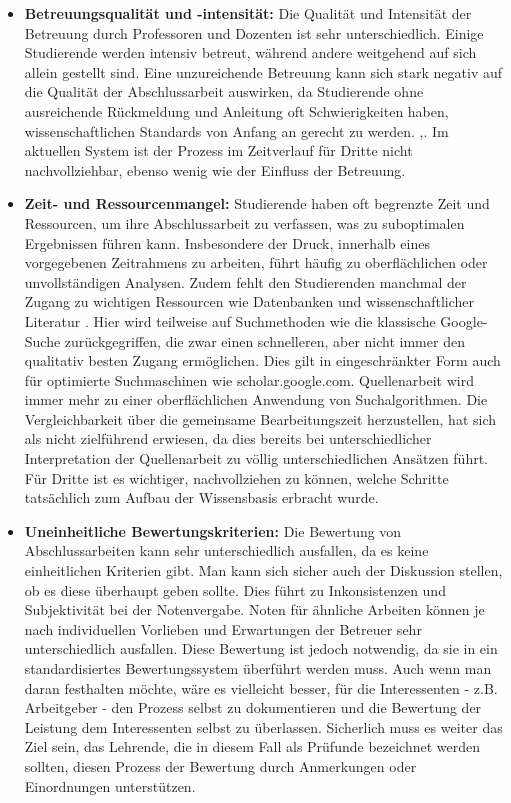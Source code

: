 \documentclass[conference]{IEEEtran}
\begin{document}
\begin{itemize}[leftmargin=*]
    \item \textbf{Betreuungsqualität und -intensität:}
    \newline Die Qualität und Intensität der Betreuung durch Professoren und Dozenten ist sehr unterschiedlich. Einige Studierende werden intensiv betreut, während andere weitgehend auf sich allein gestellt sind. Eine unzureichende Betreuung kann sich stark negativ auf die Qualität der Abschlussarbeit auswirken, da Studierende ohne ausreichende Rückmeldung und Anleitung oft Schwierigkeiten haben, wissenschaftlichen Standards von Anfang an gerecht zu werden. \cite{betreuungsleistung2023},\cite{ghadirian2014}.  Im aktuellen System ist der Prozess im Zeitverlauf für Dritte nicht nachvollziehbar, ebenso wenig wie der Einfluss der Betreuung. 

    \item \textbf{Zeit- und Ressourcenmangel:}
    \newline Studierende haben oft begrenzte Zeit und Ressourcen, um ihre Abschlussarbeit zu verfassen, was zu suboptimalen Ergebnissen führen kann. Insbesondere der Druck, innerhalb eines vorgegebenen Zeitrahmens zu arbeiten, führt häufig zu oberflächlichen oder unvollständigen Analysen. Zudem fehlt den Studierenden manchmal der Zugang zu wichtigen Ressourcen wie Datenbanken und wissenschaftlicher Literatur \cite{Rabab}. Hier wird teilweise auf Suchmethoden wie die klassische Google-Suche zurückgegriffen, die zwar einen schnelleren, aber nicht immer den qualitativ besten Zugang ermöglichen. Dies gilt in eingeschränkter Form auch für optimierte Suchmaschinen wie scholar.google.com. Quellenarbeit wird immer mehr zu einer oberflächlichen Anwendung von Suchalgorithmen. Die Vergleichbarkeit über die gemeinsame Bearbeitungszeit herzustellen, hat sich als nicht zielführend erwiesen, da dies bereits bei unterschiedlicher Interpretation der Quellenarbeit zu völlig unterschiedlichen Ansätzen führt. Für Dritte ist es wichtiger, nachvollziehen zu können, welche Schritte tatsächlich zum Aufbau der Wissensbasis erbracht wurde. 

    \item \textbf{Uneinheitliche Bewertungskriterien:}
    \newline Die Bewertung von Abschlussarbeiten kann sehr unterschiedlich ausfallen, da es keine einheitlichen Kriterien gibt. Man kann sich sicher auch der Diskussion stellen, ob es diese überhaupt geben sollte. Dies führt zu Inkonsistenzen und Subjektivität bei der Notenvergabe. Noten für ähnliche Arbeiten können je nach individuellen Vorlieben und Erwartungen der Betreuer sehr unterschiedlich ausfallen. Diese Bewertung ist jedoch notwendig, da sie in ein standardisiertes Bewertungssystem überführt werden muss. Auch wenn man daran festhalten möchte, wäre es vielleicht besser, für die Interessenten - z.B. Arbeitgeber - den Prozess selbst zu dokumentieren und die Bewertung der Leistung dem Interessenten selbst zu überlassen. Sicherlich muss es weiter das Ziel sein, das Lehrende, die in diesem Fall als Prüfunde bezeichnet werden sollten, diesen Prozess der Bewertung durch Anmerkungen oder Einordnungen unterstützen. 


\end{itemize}
\end{document}
